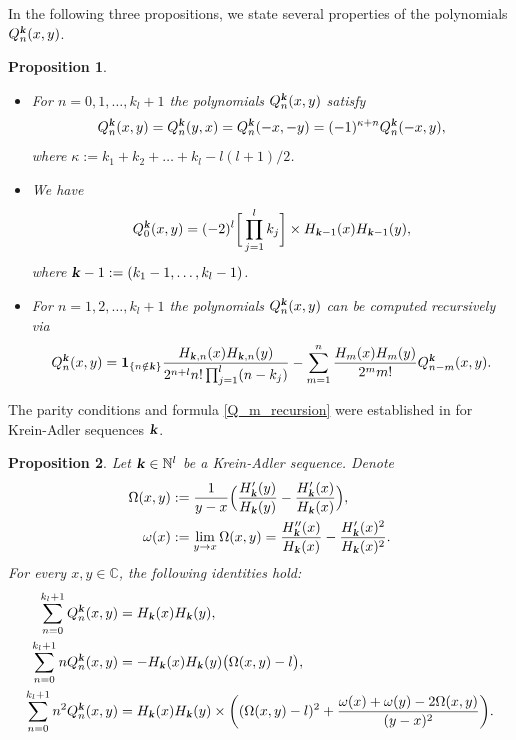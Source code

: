 \documentclass[12pt]{article}
\def\c{{\mathbb C}}
\def\n{{\mathbb N}}
\def\k{\textbf{\textsl{k}}}
\newtheorem{proposition}{Proposition}
\begin{document}
In the following three propositions, we state several properties of the polynomials $Q_n^{\k}(x,y)$. 
 
 
\begin{proposition}\label{proposition1}
${}$
\begin{itemize}
\item[(i)]
For $n=0,1,\dots,k_l+1$ the polynomials $Q_n^{\k}(x,y)$ satisfy
\[
Q^{\k}_n(x,y)=Q_n^{\k}(y,x)=Q^{\k}_n(-x,-y)=(-1)^{\kappa+n} Q^{\k}_n(-x,y),
\] where
$\kappa:=k_1+k_2+\dots+k_l-l(l+1)/2$.
\item[(ii)]
We have 
\begin{equation}\label{eqn_Qk0}
Q^{\k}_0(x,y)=(-2)^{l} \bigg[ \prod\limits_{j=1}^l k_j \bigg] \times H_{\k-1}(x) H_{\k-1}(y), 
\end{equation}
where $\k-1:=(k_1-1,\dots,k_l-1)$.
\item[(iii)]
For $n=1,2,\dots,k_l+1$
the polynomials $Q^{\k}_n(x,y)$ can be computed recursively via 
\begin{equation}\label{Q_m_recursion}
Q^{\k}_n(x,y)=
{\mathbf 1}_{\{n \notin \k\}}
\frac{H_{\k,n}(x) H_{\k,n}(y)}{2^{n+l} n! \prod_{j=1}^l (n-k_j)}-
\sum\limits_{m=1}^{n}  \frac{H_{m}(x) H_{m}(y)}{2^{m} m!}
Q^{\k}_{n-m}(x,y).
\end{equation}
\end{itemize}
\end{proposition} 

The parity conditions and formula 
\eqref{Q_m_recursion} were established in \cite{Pupasov_2015} for Krein-Adler sequences $\k$. 



\begin{proposition}\label{proposition2}
Let $\k \in \n^l$ be a Krein-Adler sequence. Denote 
\begin{align*}
\Omega(x,y)&:=\frac{1}{y-x} \Big( \frac{H'_{\k}(y)}{H_{\k}(y)}
- \frac{H'_{\k}(x)}{H_{\k}(x)} \Big),
\\
\omega(x)&:=\lim_{y\to x} \Omega(x,y)=
 \frac{H_{\k}''(x)}{H_{\k}(x)}-\frac{H_{\k}'(x)^2}{H_{\k}(x)^2}.
\end{align*}
For every $x,y\in \c$, the following identities hold:
\begin{align}
\label{sum1}
\sum\limits_{n=0}^{k_l+1} Q^{\k}_n(x,y)&= H_{\k}(x) H_{\k}(y),\\
\label{sum2}
\sum\limits_{n=0}^{k_l+1} n Q_n^{\k}(x,y)&=- H_{\k}(x) 
H_{\k}(y)\big(  \Omega(x,y)-l \big),\\
\label{sum3}
\sum\limits_{n=0}^{k_l+1} n^2 Q_n^{\k}(x,y)&= H_{\k}(x) 
H_{\k}(y) \times \bigg((\Omega(x,y)-l)^2+\frac{\omega(x)+\omega(y)-2 \Omega(x,y)}{(y-x)^2}  \bigg).
\end{align}
\end{proposition}
\end{document}

